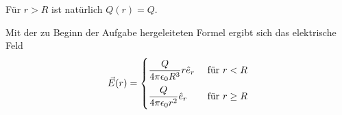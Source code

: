 \documentclass[a4paper,german,12pt,smallheadings]{scrartcl}
\begin{document}
\begin{enumerate}[a)]
    Für $r > R$ ist natürlich $Q(r) = Q$.

    Mit der zu Beginn der Aufgabe hergeleiteten Formel ergibt sich das elektrische Feld
    \begin{equation}
      \vec{E}(r) = \begin{cases}
        \dfrac{Q}{4 \pi \epsilon_0 R^3} r \hat{e}_r & \text{ für } r < R
        \vspace{0.2 cm} \\
        \dfrac{Q}{4 \pi \epsilon_0 r^2} \hat{e}_r & \text{ für } r \ge R
      \end{cases}
    \end{equation}

\end{enumerate}
\end{document}
